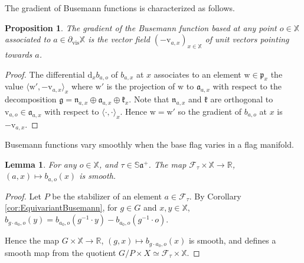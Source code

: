 \documentclass[reqno,10pt]{amsart}
\theoremstyle{plain}
\newtheorem{lem}[thm]{Lemma}
\newtheorem{prop}[thm]{Proposition}
\theoremstyle{definition}
\theoremstyle{remark}
\newcommand{\type}{\tau}
\newcommand{\Sph}{\mathbb{S}}
\DeclareMathOperator{\vis}{vis}
\newcommand{\X}{\mathbb{X}}
\begin{document}
The gradient of Busemann functions is characterized as follows.

\begin{prop}
The gradient of the Busemann function based at any point $o\in \X$ associated to $a\in \partial_{\vis}\X$ is the vector field  $(-\mathrm{v}_{a,x})_{x\in \X}$ of unit vectors pointing towards $a$.
\end{prop}

\begin{proof}
The differential $\mathrm{d}_xb_{a,o}$ of $b_{a,x}$ at $x$ associates to an element $\mathrm{w}\in \mathfrak{p}_x$ the value $\langle\mathrm{w}',-\mathrm{v}_{a,x}\rangle_x$ where $\mathrm{w}'$ is the projection of $\mathrm{w}$ to $\mathfrak{a}_{a,x}$ with respect to the decomposition $\mathfrak{g}=\mathfrak{n}_{a,x}\oplus \mathfrak{a}_{a,x}\oplus \mathfrak{k}_{x}$. Note that $\mathfrak{n}_{a,x}$ and $\mathfrak{k}$ are orthogonal to $\mathrm{v}_{a,o}\in \mathfrak{a}_{a,x}$ with respect to $\langle \cdot ,\cdot \rangle_x$. Hence $\mathrm{w}=\mathrm{w}'$ so the gradient of $b_{a,o}$ at $x$ is $-\mathrm{v}_{a,x}$.
\end{proof}

Busemann functions vary smoothly when the base flag varies in a flag manifold.

\begin{lem}
\label{lem:SmoothBusemann}
For any $o\in \X$, and $\type\in \Sph \mathfrak{a}^+$. The map $\mathcal{F}_\type \times \X\to \mathbb{R}$, $(a,x)\mapsto b_{a,o}(x)$ is smooth.
\end{lem}

\begin{proof}
Let $P$ be the stabilizer of an element $a\in \mathcal{F}_\type$. By Corollary \ref{cor:EquivariantBusemann}, for $g\in G$ and $x,y\in \X$, $b_{g\cdot a_0,o}(y)=b_{a_0,o}(g^{-1}\cdot y)-b_{a_0,o}(g^{-1}\cdot o)$.

\medskip

 Hence the map $G \times \X\to \mathbb{R}$, $(g,x)\mapsto b_{g\cdot a_0,o}(x)$ is smooth, and defines a smooth map from the quotient $G/P \times X\simeq \mathcal{F}_\type \times \X$.
 
\end{proof}
\end{document}
